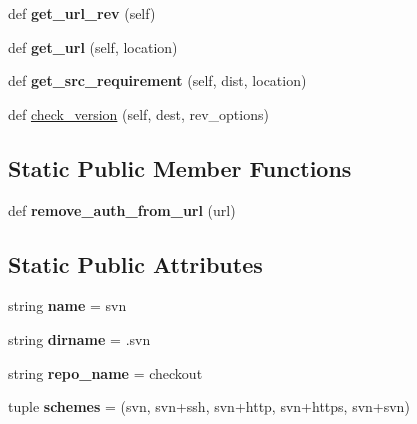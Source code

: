 \begin{DoxyCompactItemize}
def {\bfseries get\+\_\+url\+\_\+rev} (self)
\item 
\mbox{\label{classpip_1_1vcs_1_1subversion_1_1_subversion_a621b9dc420d75337603585f42176cb0b}} 
def {\bfseries get\+\_\+url} (self, location)
\item 
\mbox{\label{classpip_1_1vcs_1_1subversion_1_1_subversion_a4776c674c0103b5df8e25966c481df0c}} 
def {\bfseries get\+\_\+src\+\_\+requirement} (self, dist, location)
\item 
def \hyperlink{classpip_1_1vcs_1_1subversion_1_1_subversion_aa07ff8ae3a38f5ddafaeaae4abbce16d}{check\+\_\+version} (self, dest, rev\+\_\+options)
\end{DoxyCompactItemize}
\subsection*{Static Public Member Functions}
\begin{DoxyCompactItemize}
\item 
\mbox{\label{classpip_1_1vcs_1_1subversion_1_1_subversion_a2957f0a87166a98395a5bbafba74aab5}} 
def {\bfseries remove\+\_\+auth\+\_\+from\+\_\+url} (url)
\end{DoxyCompactItemize}
\subsection*{Static Public Attributes}
\begin{DoxyCompactItemize}
\item 
\mbox{\label{classpip_1_1vcs_1_1subversion_1_1_subversion_ae659c24b363ea8d776ec125aeb3c80b0}} 
string {\bfseries name} = \textquotesingle{}svn\textquotesingle{}
\item 
\mbox{\label{classpip_1_1vcs_1_1subversion_1_1_subversion_a401606686e53f83d754e8fb4bbfbbde8}} 
string {\bfseries dirname} = \textquotesingle{}.svn\textquotesingle{}
\item 
\mbox{\label{classpip_1_1vcs_1_1subversion_1_1_subversion_a1fe271cb47e6c7c076b3929b8d2b2744}} 
string {\bfseries repo\+\_\+name} = \textquotesingle{}checkout\textquotesingle{}
\item 
\mbox{\label{classpip_1_1vcs_1_1subversion_1_1_subversion_af4568be2050ecb3f4536b5b98ddb9ac0}} 
tuple {\bfseries schemes} = (\textquotesingle{}svn\textquotesingle{}, \textquotesingle{}svn+ssh\textquotesingle{}, \textquotesingle{}svn+http\textquotesingle{}, \textquotesingle{}svn+https\textquotesingle{}, \textquotesingle{}svn+svn\textquotesingle{})
\end{DoxyCompactItemize}
